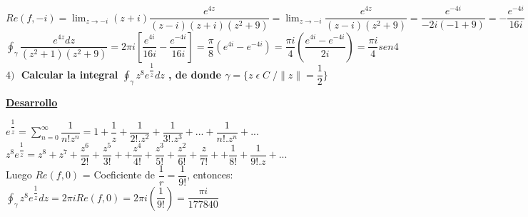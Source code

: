 \documentclass[10pt,a4paper]{article}
\begin{document}
$\displaystyle{Re(f,-i) = \lim_{z \to -i} (z+i) \dfrac{e^{4z}}{(z-i)(z+i)(z^2+9)} = \lim_{z \to -i} \dfrac{e^{4z}}{(z-i)(z^2+9)} = \dfrac{e^{-4i}}{-2i(-1+9)} = -\dfrac{e^{-4i}}{16i}}$\\
$\displaystyle{\oint_{\gamma} \dfrac{e^{4z} dz}{(z^2+1)(z^2+9)} = 2 \pi i [\dfrac{e^{4i}}{16i} - \dfrac{e^{-4i}}{16i}] = \dfrac{\pi}{8} (e^{4i} - e^{-4i}) = \dfrac{\pi i}{4}(\dfrac{e^{4i} - e^{-4i}}{2i}) = \dfrac{\pi i}{4} sen 4}$\\
\textbf{$4) \; $ Calcular la integral $\displaystyle{\oint_{\gamma} z^8 e^{\dfrac{1}{z}}dz}$ , de donde $\gamma = \{ z \; \epsilon \; C \; / \parallel z \parallel = \dfrac{1}{2} \} $}\\
\begin{center}
\textbf{\underline{Desarrollo}}
\end{center}
$\displaystyle{e^{\dfrac{1}{z}} = \sum_{n = 0}^{\infty} \dfrac{1}{n! z^n} = 1 + \dfrac{1}{z} + \dfrac{1}{2!.z^2} + \dfrac{1}{3!.z^3} + ... + \dfrac{1}{n!.z^n} + ... }$\\
$\displaystyle{z^8 e^{\dfrac{1}{z}} =  z^8 + z^7 + \dfrac{z^6}{2!}+ \dfrac{z^5}{3!} + + \dfrac{z^4}{4!} + \dfrac{z^3}{5!} + \dfrac{z^2}{6!} + \dfrac{z}{7!} + + \dfrac{1}{8!} + \dfrac{1}{9!.z} + ...}$\\
Luego $Re(f,0)$ = Coeficiente de $\dfrac{1}{r} = \dfrac{1}{9!}$, entonces: \\
$\displaystyle{\oint_{\gamma} z^8 e^{\dfrac{1}{z}}dz = 2 \pi i Re(f,0) = 2 \pi i (\dfrac{1}{9!}) = \dfrac{\pi i}{177840}}$ 
\end{document}
